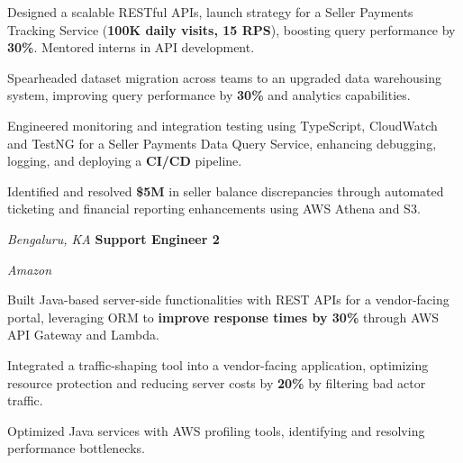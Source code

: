 \begin{onecolentry}
    \begin{highlights}
        \item Designed a scalable RESTful APIs, launch strategy for a Seller Payments Tracking Service (\textbf{100K daily visits, 15 RPS}), boosting query performance by \textbf{30\%}. Mentored interns in API development.
        \item Spearheaded dataset migration across teams to an upgraded data warehousing system, improving query performance by \textbf{30\%} and analytics capabilities.
        \item Engineered monitoring and integration testing using TypeScript, CloudWatch and TestNG for a Seller Payments Data Query Service, enhancing debugging, logging, and deploying a \textbf{CI/CD} pipeline.
        \item Identified and resolved \textbf{\$5M} in seller balance discrepancies through automated ticketing and financial reporting enhancements using AWS Athena and S3.
    \end{highlights}
\end{onecolentry}

\vspace{0.15 cm}

\begin{twocolentry}{
    \textit{Bengaluru, KA}}
    \textbf{Support Engineer 2}
    
    \textit{Amazon}
\end{twocolentry}

\vspace{0.15 cm}

\begin{onecolentry}
    \begin{highlights}
        \item Built Java-based server-side functionalities with REST APIs for a vendor-facing portal, leveraging ORM to \textbf{improve response times by 30\%} through AWS API Gateway and Lambda.
        \item Integrated a traffic-shaping tool into a vendor-facing application, optimizing resource protection and reducing server costs by \textbf{20\%} by filtering bad actor traffic.
        \item Optimized Java services with AWS profiling tools, identifying and resolving performance bottlenecks.
    \end{highlights}
\end{onecolentry}
